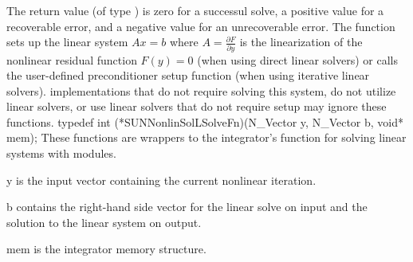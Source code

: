 {
  The return value  (of type ) is zero for a
  successul solve, a positive value for a recoverable error, and a
  negative value for an unrecoverable error.
}
{
  The  function sets up the linear system $Ax=b$ where
  $A = \frac{\partial F}{\partial y}$ is the linearization of the nonlinear
  residual function $F(y) = 0$ (when using {\sunlinsol} direct linear solvers)
  or calls the user-defined preconditioner setup function (when using
  {\sunlinsol} iterative linear solvers). {\sunnonlinsol} implementations that
  do not require solving this system, do not utilize {\sunlinsol} linear
  solvers, or use {\sunlinsol} linear solvers that do not require setup may
  ignore these functions.
}
{
  typedef int (*SUNNonlinSolLSolveFn)(N\_Vector y, N\_Vector b, void* mem);
}
{
  These functions are wrappers to the {\sundials} integrator's function
  for solving linear systems with {\sunlinsol} modules.
}
{
  \begin{args}[mem]
  \item[y]
    is the input vector containing the current nonlinear iteration.
  \item[b]
    contains the right-hand side vector for the linear solve on input
    and the solution to the linear system on output.
  \item[mem]
    is the {\sundials} integrator memory structure.
  \end{args}
}
